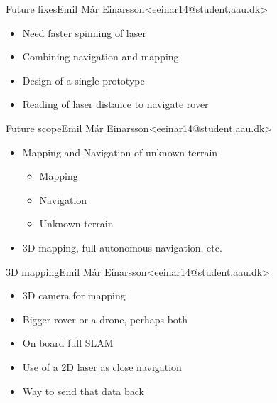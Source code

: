 \begin{frame}{Future fixes}{Emil Már Einarsson\newline<eeinar14@student.aau.dk>}
  \begin{itemize}
  	\item <2-> Need faster spinning of laser
  	\item <3-> Combining navigation and mapping 
  	\item <4-> Design of a single prototype
  	\item <5-> Reading of laser distance to navigate rover
  \end{itemize}
\end{frame}

\begin{frame}{Future scope}{Emil Már Einarsson\newline<eeinar14@student.aau.dk>}
	\begin{itemize}
		\item <2-> Mapping and Navigation of unknown terrain
		\begin{itemize}
			\item <2-> Mapping %
			\item <2-> Navigation %
			\item <2-> Unknown terrain %
		\end{itemize}
		\item <3-> 3D mapping, full autonomous navigation, etc. %
	\end{itemize}
\end{frame}

\begin{frame}{3D mapping}{Emil Már Einarsson\newline<eeinar14@student.aau.dk>}
  \begin{itemize}
  	\item <2-> 3D camera for mapping
  	\item <3-> Bigger rover or a drone, perhaps both
  	\item <4-> On board full SLAM
  	\item <5-> Use of a 2D laser as close navigation
  	\item <6-> Way to send that data back
  \end{itemize}
\end{frame}

